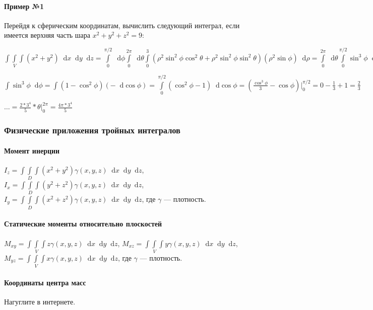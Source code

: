 \documentclass{article}
\newcommand*\diff{\mathop{}\!\mathrm{d}}
\begin{document}
\paragraph{Пример №1} Перейдя к сферическим координатам, вычислить следующий интеграл, если имеется верхняя часть шара $x^2 + y^2 + z^2 = 9$:

$\int\int\limits_{V} \int (x^2 + y^2) \diff x \diff y \diff z = \int\limits_{0}^{\pi/2} \diff \phi \int\limits_{0}^{2 \pi} \diff \theta \int\limits_{0}^{3} (\rho^2 \sin^2 \phi \cos^2 \theta + \rho^2 \sin^2 \phi \sin^2 \theta) (\rho^2 \sin \phi) \diff \rho = \int\limits_{0}^{2 \pi} \diff \theta \int\limits_{0}^{\pi/2} \sin^3 \phi \diff \phi \int\limits_{0}^{3} \rho^4 \diff \rho = \frac{3^5}{5}\bigg|_{0}^{2 \pi} \diff \theta = \dots$

$\int \sin^3 \phi \diff \phi = \int (1 - \cos^2 \phi)(-\diff \cos \phi) = \int\limits_{0}^{\pi/2} (\cos^2 \phi - 1) \diff \cos \phi = (\frac{\cos^3 \phi}{3} - \cos \phi) \bigg|_{0}^{\pi/2} = 0 - \frac{1}{3} + 1 = \frac{2}{3}$

$\dots = \frac{2 * 3^{4}}{5} * \theta \bigg|_{0}^{2 \pi} = \frac{4 \pi * 3^4}{5}$

\subsubsection{Физические приложения тройных интегралов}

\paragraph{Момент инерции} $I_{z} = \int\int\limits_{D}\int (x^2 + y^2) \gamma (x, y, z) \diff x \diff y \diff z$, $I_{x} = \int\int\limits_{D}\int (y^2 + z^2) \gamma (x, y, z) \diff x \diff y \diff z$, $I_{y} = \int\int\limits_{D}\int (x^2 + z^2) \gamma (x, y, z) \diff x \diff y \diff z$, где $\gamma$ — плотность.

\paragraph{Статические моменты относительно плоскостей} $M_{x y} = \int\int\limits_{V} \int z \gamma (x, y, z) \diff x \diff y \diff z$, $M_{x z} = \int\int\limits_{V} \int y \gamma (x, y, z) \diff x \diff y \diff z$, $M_{y z} = \int\int\limits_{V} \int x \gamma (x, y, z) \diff x \diff y \diff z$, где $\gamma$ — плотность.

\paragraph{Координаты центра масс} Нагуглите в интернете.
\end{document}
